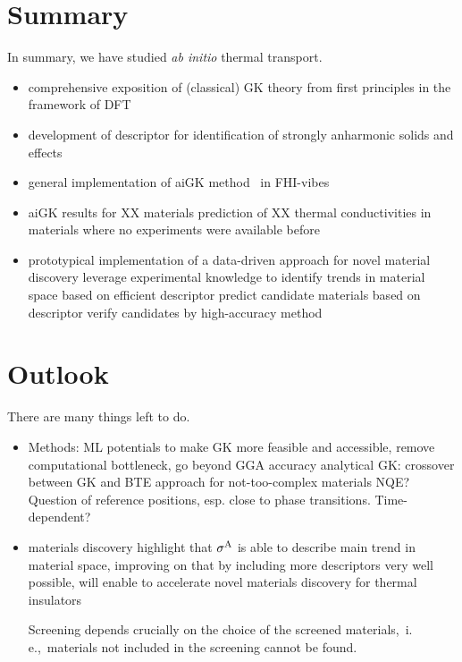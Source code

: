 \section{Summary}

In summary, we have studied \emph{ab initio} thermal transport.

\begin{itemize}
	\item comprehensive exposition of (classical) GK theory from first principles in the framework of DFT
	\item development of descriptor for identification of strongly anharmonic solids and effects~\cite{Knoop2020}
	\item general implementation of aiGK method~\cite{Carbogno2016} in FHI-vibes~\cite{FHI-vibes}
	\item aiGK results for XX materials
		\subitem prediction of XX thermal conductivities in materials where no experiments were available before
	\item prototypical implementation of a data-driven approach for novel material discovery
		\subitem leverage experimental knowledge to identify trends in material space based on efficient descriptor
		\subitem predict candidate materials based on descriptor
		\subitem verify candidates by high-accuracy method
\end{itemize}

\section{Outlook}

There are many things left to do.

\begin{itemize}
	\item Methods:
		\subitem ML potentials to make GK more feasible and accessible, remove computational bottleneck, go beyond GGA accuracy  
		\subitem analytical GK: crossover between GK and BTE approach for not-too-complex materials
			\subsubitem NQE? \cite{shulumba2017,sutherland2021}
		\subitem Question of reference positions, esp. close to phase transitions. Time-dependent?
	\item materials discovery
		\subitem highlight that $\sigma^\mathrm{A}$ is able to describe main trend in material space, improving on that by including more descriptors very well possible, will enable to accelerate novel materials discovery for thermal insulators
		
		\subitem Screening depends crucially on the choice of the screened materials,~i.\,e.,~materials not included in the screening cannot be found.
\end{itemize}